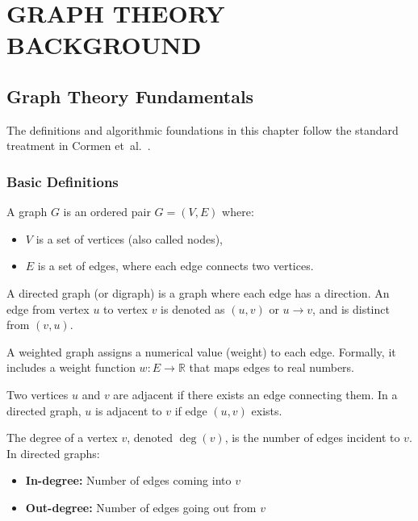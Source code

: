 \chapter{GRAPH THEORY BACKGROUND}

\section{Graph Theory Fundamentals}
The definitions and algorithmic foundations in this chapter follow the standard treatment in Cormen et~al.~\cite{cormen2022introduction}.

\subsection{Basic Definitions}

\begin{definition}[Graph]
A graph $G$ is an ordered pair $G = (V, E)$ where:
\begin{itemize}
    \item $V$ is a set of vertices (also called nodes),
    \item $E$ is a set of edges, where each edge connects two vertices.
\end{itemize}
\end{definition}

\begin{definition}
A directed graph (or digraph) is a graph where each edge has a direction. An edge from vertex $u$ to vertex $v$ is denoted as $(u, v)$ or $u \to v$, and is distinct from $(v, u)$.
\end{definition}

\begin{definition}
A weighted graph assigns a numerical value (weight) to each edge. Formally, it includes a weight function $w : E \to \mathbb{R}$ that maps edges to real numbers.
\end{definition}

\begin{definition}[Adjacency]
Two vertices $u$ and $v$ are adjacent if there exists an edge connecting them. In a directed graph, $u$ is adjacent to $v$ if edge $(u, v)$ exists.
\end{definition}

\begin{definition}[Degree]
The degree of a vertex $v$, denoted $\deg(v)$, is the number of edges incident to $v$. In directed graphs:
\begin{itemize}
    \item \textbf{In-degree:} Number of edges coming into $v$
    \item \textbf{Out-degree:} Number of edges going out from $v$
\end{itemize}
\end{definition}


